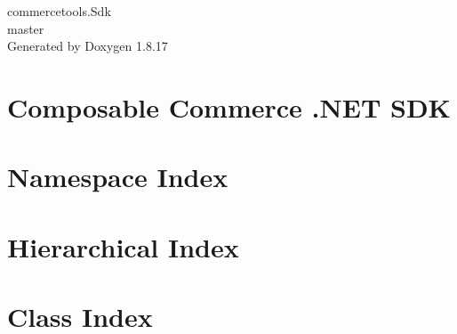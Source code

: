 \let\mypdfximage\pdfximage\def\pdfximage{\immediate\mypdfximage}\documentclass[twoside]{book}
\newcommand{\+}{\discretionary{\mbox{\scriptsize$\hookleftarrow$}}{}{}}
\newcommand{\clearemptydoublepage}{%
  \newpage{\pagestyle{empty}\cleardoublepage}%
}
\begin{document}
\hypersetup{pageanchor=false,
             bookmarksnumbered=true,
             pdfencoding=unicode
            }
\begin{titlepage}
\vspace*{7cm}
\begin{center}%
{\Large commercetools.\+Sdk \\[1ex]\large master }\\
\vspace*{1cm}
{\large Generated by Doxygen 1.8.17}\\
\end{center}
\end{titlepage}
\clearemptydoublepage
{}
\tableofcontents
\clearemptydoublepage
{}
\hypersetup{pageanchor=true}

\chapter{Composable Commerce .N\+ET S\+DK}
\label{index}\hypertarget{index}{}
\chapter{Namespace Index}

\chapter{Hierarchical Index}

\chapter{Class Index}

\end{document}
